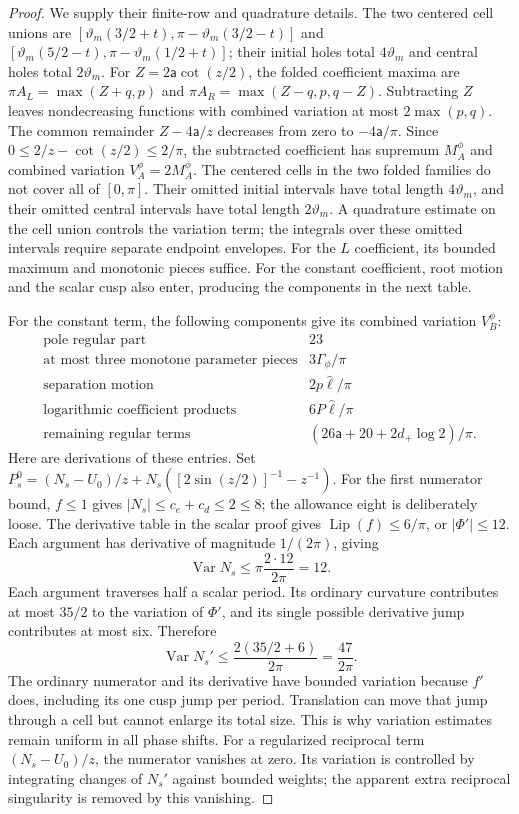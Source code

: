 \begin{proof}
We supply their finite-row and quadrature details. The two centered
cell unions are
$[\vartheta_m(3/2+t),\pi-\vartheta_m(3/2-t)]$ and
$[\vartheta_m(5/2-t),\pi-\vartheta_m(1/2+t)]$; their initial holes total $4\vartheta_m$ and
central holes total $2\vartheta_m$. For $Z=2\mathsf a\cot(z/2)$, the folded coefficient maxima are
$\pi A_L=\max(Z+q,p)$ and $\pi A_R=\max(Z-q,p,q-Z)$.
Subtracting $Z$ leaves nondecreasing functions with combined
variation at most $2\max(p,q)$. The common remainder
$Z-4\mathsf a/z$ decreases from zero to $-4\mathsf a/\pi$.
Since $0\leq2/z-\cot(z/2)\leq2/\pi$, the subtracted coefficient
has supremum $M_A^\phi$ and combined variation $V_A^\phi=2M_A^\phi$.
The centered cells in the two folded families do not cover all of
$[0,\pi]$. Their omitted initial intervals have total length $4\vartheta_m$,
and their omitted central intervals have total length $2\vartheta_m$. A quadrature
estimate on the cell union controls the variation term; the integrals
over these omitted intervals require separate endpoint envelopes.
For the $L$ coefficient, its bounded maximum and monotonic pieces
suffice. For the constant coefficient, root motion and the scalar cusp
also enter, producing the components in the next table.

For the constant term, the following components give its combined
variation $V_B^\phi$:
\[
\begin{array}{cc}
\text{pole regular part}&23\\
\text{at most three monotone parameter pieces}&3\Gamma_\phi/\pi\\
\text{separation motion}&2p\hat{\ell}/\pi\\
\text{logarithmic coefficient products}&6P\hat{\ell}/\pi\\
\text{remaining regular terms}&(26\mathsf{a}+20+2d_+\log2)/\pi.
\end{array}
\]
Here are derivations of these entries. Set
$P_s^0=(N_s-U_0)/z+N_s([2\sin(z/2)]^{-1}-z^{-1})$.
For the first numerator bound, $f\leq1$ gives
$|N_s|\leq c_e+c_d\leq2\leq8$; the allowance eight is deliberately
loose. The derivative table in the scalar proof gives
$\operatorname{Lip}(f)\leq6/\pi$, or $|\Phi'|\leq12$.
Each argument has derivative of magnitude $1/(2\pi)$, giving
\[
 \operatorname{Var}N_s\leq\pi\frac{2\cdot12}{2\pi}=12.
\]
Each argument traverses half a scalar period. Its ordinary curvature
contributes at most $35/2$ to the variation of $\Phi'$, and its
single possible derivative jump contributes at most six. Therefore
\[
 \operatorname{Var}N_s'\leq
    \frac{2(35/2+6)}{2\pi}=\frac{47}{2\pi}.
\]
The ordinary numerator and its derivative have bounded variation
because $f'$ does, including its one cusp jump per period. Translation
can move that jump through a cell but cannot enlarge its total size.
This is why variation estimates remain uniform in all phase shifts.
For a regularized reciprocal term $(N_s-U_0)/z$, the numerator vanishes
at zero. Its variation is controlled by integrating changes of $N_s'$
against bounded weights; the apparent extra reciprocal singularity
is removed by this vanishing.


\end{proof}
